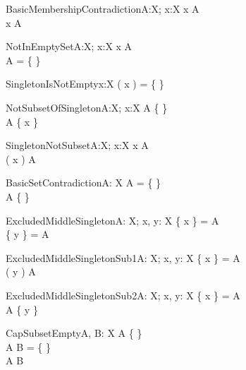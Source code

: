 \begin{theorem}{BasicMembershipContradiction}{A:\power X; x:X}
x \in A \\
x \notin A
\end{theorem}

\begin{theorem}{NotInEmptySet}{A:\power X; x:X}
x \in A \\
A = \{ \}
\end{theorem}

\begin{theorem}{SingletonIsNotEmpty}{x:X}
\se( x ) = \{ \}
\end{theorem}

\begin{theorem}{NotSubsetOfSingleton}{A:\power X; x:X}
A \neq \{ \} \\
A \subset \{ x \} 
\end{theorem}

\begin{theorem}{SingletonNotSubset}{A:\power X; x:X}
x \notin A \\
\se( x ) \subset A
\end{theorem}

\begin{theorem}{BasicSetContradiction}{A: \power X}
A = \{ \} \\
A \neq \{ \}
\end{theorem}

\begin{theorem}{ExcludedMiddleSingleton}{A: \power X; \const x, \const y: X}
\{ x \} = A \\
\{ y \} = A
\end{theorem}

\begin{theorem}{ExcludedMiddleSingletonSub1}{A: \power X; \const x, \const y: X}
\{ x \} = A \\
\se( y ) \subset A
\end{theorem}

\begin{theorem}{ExcludedMiddleSingletonSub2}{A: \power X; \const x, \const y: X}
\{ x \} = A \\
A  \subset \{ y \}
\end{theorem}

\begin{theorem}{CapSubsetEmpty}{A, B: \power X}
A \neq \{ \} \\
A \cap B = \{ \} \\
A \subset B
\end{theorem}

